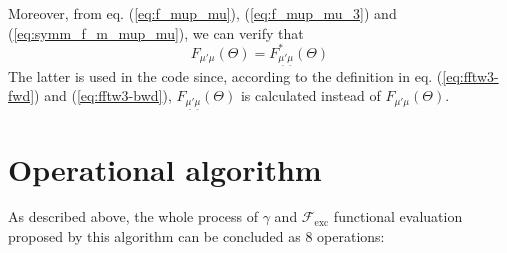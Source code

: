Moreover, from eq. (\ref{eq:f_mup_mu}), (\ref{eq:f_mup_mu_3}) and
(\ref{eq:symm_f_m_mup_mu}), we can verify that
\begin{equation}
F_{\mu'\mu}(\Theta)=F_{\underline{\mu'}\underline{\mu}}^{*}(\Theta)
\end{equation}
The latter is used in the code since, according to the definition
in eq. (\ref{eq:fftw3-fwd}) and (\ref{eq:fftw3-bwd}), $F_{\underline{\mu'}\underline{\mu}}(\Theta)$
is calculated instead of $F_{\mu'\mu}(\Theta)$.

\section{Operational algorithm\label{sec:Operational-algorithm}}

As described above, the whole process of $\gamma$ and $\mathcal{F}_{\mathrm{exc}}$
functional evaluation proposed by this algorithm can be concluded
as 8 operations:

